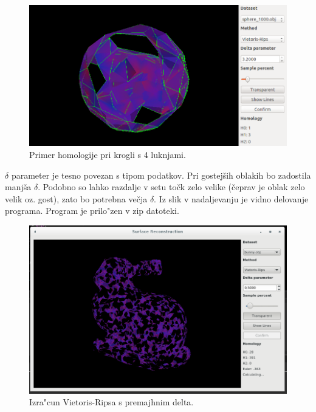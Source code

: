 \documentclass[11pt]{article}
\begin{document}
\begin{figure}[htb]
    \centering
    \includegraphics[width=1\textwidth]{lukne_primer.png}
    \caption{Primer homologije pri krogli s 4 luknjami.}
    \label{lukne}
\end{figure}

$\delta$ parameter je tesno povezan s tipom podatkov. Pri gostejših oblakih bo zadostila manjša $\delta$. Podobno so lahko razdalje v setu točk zelo velike (čeprav je oblak zelo velik oz. gost), zato bo potrebna večja $\delta$. Iz slik v nadaljevanju je vidno delovanje programa. Program je prilo"zen v zip datoteki.

\begin{figure}[htb]
    \centering
    \includegraphics[width=1\textwidth]{vr_long.png}
    \caption{Izra"cun Vietoris-Ripsa s premajhnim delta.}
    \label{fig:vr1}
\end{figure}
\end{document}
